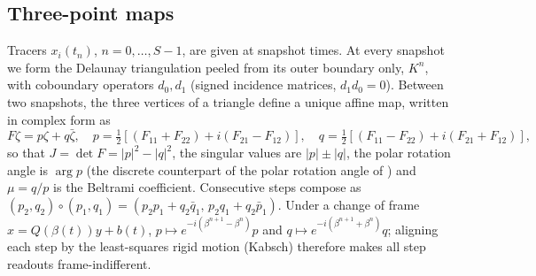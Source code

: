 \documentclass[11pt]{article}
\theoremstyle{definition}\newtheorem{definition}{Definition}\theoremstyle{remark}\newtheorem{remark}{Remark}
\begin{document}
\subsection{Three-point maps}
Tracers $x_i(t_n)$, $n=0,\dots,S-1$, are given at snapshot times. At every snapshot we form the Delaunay triangulation peeled from its outer boundary only, $K^n$, with coboundary operators $d_0,d_1$ (signed incidence matrices, $d_1d_0=0$). Between two snapshots, the three vertices of a triangle define a unique affine map, written in complex form as
\begin{equation}
F\zeta=p\zeta+q\bar\zeta,\quad p=\tfrac12[(F_{11}+F_{22})+i(F_{21}-F_{12})],\quad q=\tfrac12[(F_{11}-F_{22})+i(F_{21}+F_{12})],
\end{equation}
so that $J=\det F=|p|^2-|q|^2$, the singular values are $|p|\pm|q|$, the polar rotation angle is $\arg p$ (the discrete counterpart of the polar rotation angle of \citep{FarazmandHaller2016}) and $\mu=q/p$ is the Beltrami coefficient. Consecutive steps compose as $(p_2,q_2)\circ(p_1,q_1)=(p_2p_1+q_2\bar q_1,\,p_2q_1+q_2\bar p_1)$. Under a change of frame $x=Q(\beta(t))y+b(t)$, $p\mapsto e^{-i(\beta^{n+1}-\beta^n)}p$ and $q\mapsto e^{-i(\beta^{n+1}+\beta^n)}q$; aligning each step by the least-squares rigid motion (Kabsch) therefore makes all step readouts frame-indifferent.
\end{document}

